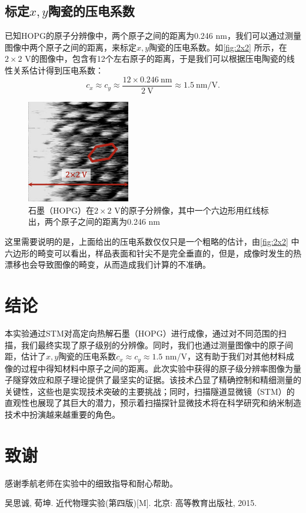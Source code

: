 \documentclass[font=default]{mpltx}
\begin{document}
\subsection{标定$x,y$陶瓷的压电系数}
已知HOPG的原子分辨像中，两个原子之间的距离为0.246 nm，我们可以通过测量图像中两个原子之间的距离，来标定$x,y$陶瓷的压电系数。如\autoref{fig:2x2} 所示，在$2\times2$ V的图像中，包含有12个左右原子的距离，于是我们可以根据压电陶瓷的线性关系估计得到压电系数：
\begin{equation}
  c_x\approx c_y\approx \frac{12\times0.246\ \text{nm}}{2\ \text{V}}\approx1.5\ \text{nm/V}.
\end{equation}
\begin{figure}
  \centering
  \includegraphics[width=0.4\textwidth]{fig/2x2.png}
  \caption{石墨（HOPG）在$2\times2$ V的原子分辨像，其中一个六边形用红线标出，两个原子之间的距离为0.246 nm}
  \label{fig:2x2}
\end{figure}

这里需要说明的是，上面给出的压电系数仅仅只是一个粗略的估计，由\autoref{fig:2x2} 中六边形的畸变可以看出，样品表面和针尖不是完全垂直的，但是，成像时发生的热漂移也会导致图像的畸变，从而造成我们计算的不准确。

\section{结论}
本实验通过STM对高定向热解石墨（HOPG）进行成像，通过对不同范围的扫描，我们最终实现了原子级别的分辨像。同时，我们也通过测量图像中的原子间距，估计了$x,y$陶瓷的压电系数$c_x\approx c_y\approx1.5$ nm/V，这有助于我们对其他材料成像的过程中得知材料中原子之间的距离。此次实验中获得的原子级分辨率图像为量子隧穿效应和原子理论提供了最坚实的证据。该技术凸显了精确控制和精细测量的关键性，这些也是实现技术突破的主要挑战；同时，扫描隧道显微镜（STM）的直观性也展现了其巨大的潜力，预示着扫描探针显微技术将在科学研究和纳米制造技术中扮演越来越重要的角色。

\section{致谢}
感谢季航老师在实验中的细致指导和耐心帮助。
\begin{thebibliography}{}
   吴思诚, 荀坤. 近代物理实验(第四版)[M]. 北京: 高等教育出版社, 2015.
\end{thebibliography}
\end{document}
